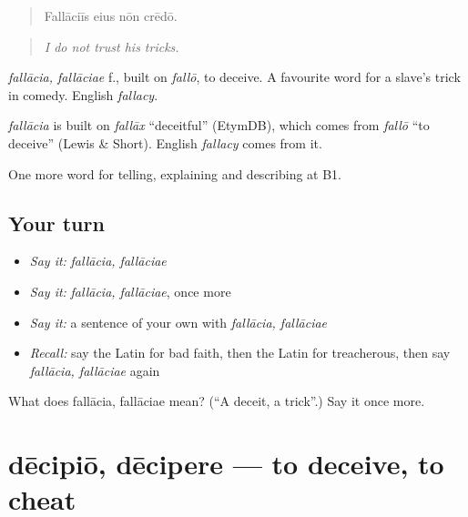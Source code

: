 \begin{quote}
Fallāciīs eius nōn crēdō.
\end{quote}

\begin{quote}
\emph{I do not trust his tricks.}
\end{quote}

\emph{fallācia, fallāciae} f., built on \emph{fallō}, to deceive. A favourite word for a slave's trick in comedy. English \emph{fallacy}.

\begin{cousinweb}
\emph{fallācia} is built on \emph{fallāx} \textquotedblleft{}deceitful\textquotedblright{} (EtymDB), which comes from \emph{fallō} \textquotedblleft{}to deceive\textquotedblright{} (Lewis \& Short). English \emph{fallacy} comes from it.
\end{cousinweb}

\begin{grammarlens}[title={What you've built}]
One more word for telling, explaining and describing at B1.
\end{grammarlens}

\subsection*{Your turn}
\begin{itemize}
\raggedright
  \item \emph{Say it:} \emph{fallācia, fallāciae}
  \item \emph{Say it:} \emph{fallācia, fallāciae}, once more
  \item \emph{Say it:} a sentence of your own with \emph{fallācia, fallāciae}
  \item \emph{Recall:} say the Latin for bad faith, then the Latin for treacherous, then say \emph{fallācia, fallāciae} again
\end{itemize}

\begin{tcolorbox}[breakable,colback=teal!4,colframe=teal!35!black,title={Before you move on}]
What does fallācia, fallāciae mean? (\textquotedblleft{}A deceit, a trick\textquotedblright{}.) Say it once more.
\end{tcolorbox}
\section[dēcipiō, dēcipere]{dēcipiō, dēcipere — to deceive, to cheat}

\label{lesson:LA-C399-decipio}



